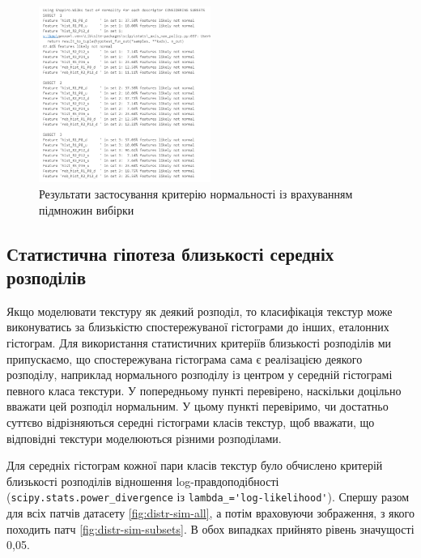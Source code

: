 \begin{figure}[h]
    \centering
    \includegraphics[width=0.5\textwidth]{img/normality-test-subsets.png}
    \caption{
        Результати застосування критерію нормальності із врахуванням підмножин вибірки
    }
    \label{fig:normaltest-subsets}
\end{figure}


\subsection{Статистична гіпотеза близькості середніх розподілів}\label{section2.1c2}

Якщо моделювати текстуру як деякий розподіл, то класифікація текстур може виконуватись за близькістю 
спостережуваної гістограми до інших, еталонних гістограм. 
Для використання статистичних критеріїв близькості розподілів ми припускаємо, 
що спостережувана гістограма сама є реалізацією деякого розподілу, 
наприклад нормального розподілу із центром у середній гістограмі певного класа текстури.
У попередньому пункті перевірено, наскільки доцільно вважати цей розподіл нормальним.
У цьому пункті перевіримо, чи достатньо суттєво відрізняються середні гістограми класів текстур, щоб вважати, 
що відповідні текстури моделюються різними розподілами.

Для середніх гістограм кожної пари класів текстур було обчислено критерій близькості розподілів відношення log-правдоподібності (\verb|scipy.stats.power_divergence| із \verb|lambda_='log-likelihood'|). 
Спершу разом для всіх патчів датасету \ref{fig:distr-sim-all}, а потім враховуючи зображення, з якого походить патч \ref{fig:distr-sim-subsets}. 
В обох випадках прийнято рівень значущості 0,05. 

